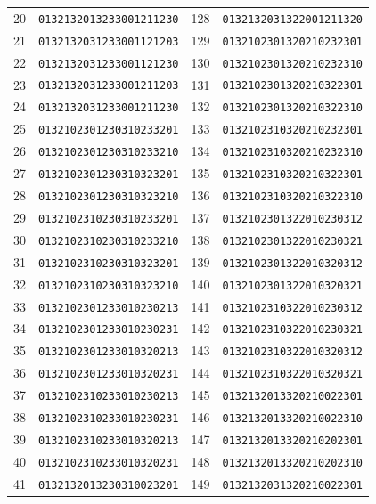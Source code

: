 \documentclass[aps,pra,reprint,superscriptaddress,longbibliography,nofootinbib,floatfix,10pt]{revtex4-2}
\theoremstyle{definition}
\begin{document}
\begin{longtable}{rl@{\qquad}rl}
20 & \texttt{0132132013233001211230} & 128 & \texttt{0132132031322001211320}\\
21 & \texttt{0132132031233001121203} & 129 & \texttt{0132102301320210232301}\\
22 & \texttt{0132132031233001121230} & 130 & \texttt{0132102301320210232310}\\
23 & \texttt{0132132031233001211203} & 131 & \texttt{0132102301320210322301}\\
24 & \texttt{0132132031233001211230} & 132 & \texttt{0132102301320210322310}\\
25 & \texttt{0132102301230310233201} & 133 & \texttt{0132102310320210232301}\\
26 & \texttt{0132102301230310233210} & 134 & \texttt{0132102310320210232310}\\
27 & \texttt{0132102301230310323201} & 135 & \texttt{0132102310320210322301}\\
28 & \texttt{0132102301230310323210} & 136 & \texttt{0132102310320210322310}\\
29 & \texttt{0132102310230310233201} & 137 & \texttt{0132102301322010230312}\\
30 & \texttt{0132102310230310233210} & 138 & \texttt{0132102301322010230321}\\
31 & \texttt{0132102310230310323201} & 139 & \texttt{0132102301322010320312}\\
32 & \texttt{0132102310230310323210} & 140 & \texttt{0132102301322010320321}\\
33 & \texttt{0132102301233010230213} & 141 & \texttt{0132102310322010230312}\\
34 & \texttt{0132102301233010230231} & 142 & \texttt{0132102310322010230321}\\
35 & \texttt{0132102301233010320213} & 143 & \texttt{0132102310322010320312}\\
36 & \texttt{0132102301233010320231} & 144 & \texttt{0132102310322010320321}\\
37 & \texttt{0132102310233010230213} & 145 & \texttt{0132132013320210022301}\\
38 & \texttt{0132102310233010230231} & 146 & \texttt{0132132013320210022310}\\
39 & \texttt{0132102310233010320213} & 147 & \texttt{0132132013320210202301}\\
40 & \texttt{0132102310233010320231} & 148 & \texttt{0132132013320210202310}\\
41 & \texttt{0132132013230310023201} & 149 & \texttt{0132132031320210022301}\\

\end{longtable}
\end{document}
